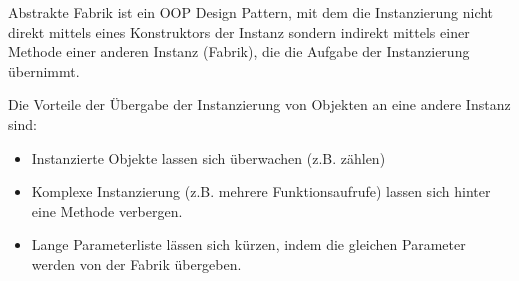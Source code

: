 Abstrakte Fabrik ist ein OOP Design Pattern, mit dem die Instanzierung nicht direkt mittels eines Konstruktors der Instanz 
sondern indirekt mittels einer Methode einer anderen Instanz (Fabrik), die die Aufgabe der Instanzierung übernimmt.

Die Vorteile der Übergabe der Instanzierung von Objekten an eine andere Instanz sind:
\begin{itemize}
    \item Instanzierte Objekte lassen sich überwachen (z.B. zählen)
    \item Komplexe Instanzierung (z.B. mehrere Funktionsaufrufe) lassen sich hinter eine Methode verbergen.
    \item Lange Parameterliste lässen sich kürzen, indem die gleichen Parameter werden von der Fabrik übergeben.
\end{itemize}